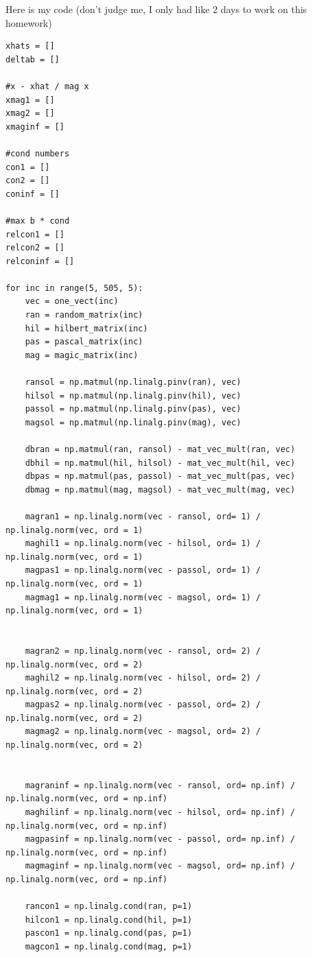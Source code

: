  \begin{solution}
     Here is my code (don't judge me, I only had like 2 days to work on this homework)

     \begin{lstlisting}
xhats = []
deltab = []

#x - xhat / mag x
xmag1 = []
xmag2 = []
xmaginf = []

#cond numbers
con1 = []
con2 = []
coninf = []

#max b * cond
relcon1 = []
relcon2 = []
relconinf = []

for inc in range(5, 505, 5):
    vec = one_vect(inc)
    ran = random_matrix(inc)
    hil = hilbert_matrix(inc)
    pas = pascal_matrix(inc)
    mag = magic_matrix(inc)
    
    ransol = np.matmul(np.linalg.pinv(ran), vec)
    hilsol = np.matmul(np.linalg.pinv(hil), vec)
    passol = np.matmul(np.linalg.pinv(pas), vec)
    magsol = np.matmul(np.linalg.pinv(mag), vec)
    
    dbran = np.matmul(ran, ransol) - mat_vec_mult(ran, vec) 
    dbhil = np.matmul(hil, hilsol) - mat_vec_mult(hil, vec)
    dbpas = np.matmul(pas, passol) - mat_vec_mult(pas, vec)
    dbmag = np.matmul(mag, magsol) - mat_vec_mult(mag, vec)
    
    magran1 = np.linalg.norm(vec - ransol, ord= 1) / np.linalg.norm(vec, ord = 1)
    maghil1 = np.linalg.norm(vec - hilsol, ord= 1) / np.linalg.norm(vec, ord = 1)
    magpas1 = np.linalg.norm(vec - passol, ord= 1) / np.linalg.norm(vec, ord = 1)
    magmag1 = np.linalg.norm(vec - magsol, ord= 1) / np.linalg.norm(vec, ord = 1)
    
    
    magran2 = np.linalg.norm(vec - ransol, ord= 2) / np.linalg.norm(vec, ord = 2)
    maghil2 = np.linalg.norm(vec - hilsol, ord= 2) / np.linalg.norm(vec, ord = 2)
    magpas2 = np.linalg.norm(vec - passol, ord= 2) / np.linalg.norm(vec, ord = 2)
    magmag2 = np.linalg.norm(vec - magsol, ord= 2) / np.linalg.norm(vec, ord = 2)
    
    
    magraninf = np.linalg.norm(vec - ransol, ord= np.inf) / np.linalg.norm(vec, ord = np.inf)
    maghilinf = np.linalg.norm(vec - hilsol, ord= np.inf) / np.linalg.norm(vec, ord = np.inf)
    magpasinf = np.linalg.norm(vec - passol, ord= np.inf) / np.linalg.norm(vec, ord = np.inf)
    magmaginf = np.linalg.norm(vec - magsol, ord= np.inf) / np.linalg.norm(vec, ord = np.inf)
    
    rancon1 = np.linalg.cond(ran, p=1)
    hilcon1 = np.linalg.cond(hil, p=1)
    pascon1 = np.linalg.cond(pas, p=1)
    magcon1 = np.linalg.cond(mag, p=1)


\end{lstlisting}
\end{solution}
